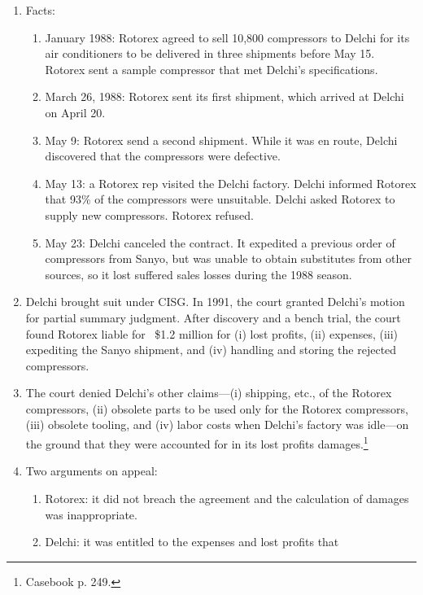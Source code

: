 \begin{enumerate}
    \item Facts:
    \begin{enumerate}
        \item January 1988: Rotorex agreed to sell 10,800 compressors to 
        Delchi for its air conditioners to be delivered in three shipments 
        before May 15. Rotorex sent a sample compressor that met Delchi's 
        specifications.
        \item March 26, 1988: Rotorex sent its first shipment, which arrived 
        at Delchi on April 20.
        \item May 9: Rotorex send a second shipment. While it was en route, 
        Delchi discovered that the compressors were defective.
        \item May 13: a Rotorex rep visited the Delchi factory. Delchi 
        informed Rotorex that 93\% of the compressors were unsuitable. Delchi 
        asked Rotorex to supply new compressors. Rotorex refused.
        \item May 23: Delchi canceled the contract. It expedited a previous 
        order of compressors from Sanyo, but was unable to obtain substitutes 
        from other sources, so it lost suffered sales losses during the 1988 
        season. 
    \end{enumerate}
    \item Delchi brought suit under CISG. In 1991, the court granted Delchi's 
    motion for partial summary judgment. After discovery and a bench trial, 
    the court found Rotorex liable for ~\$1.2 million for (i) lost profits, 
    (ii) expenses, (iii) expediting the Sanyo shipment, and (iv) handling and 
    storing the rejected compressors.
    \item The court denied Delchi's other claims---(i) shipping, etc., 
    of the Rotorex compressors, (ii) obsolete parts to be used only for the 
    Rotorex compressors, (iii) obsolete tooling, and (iv) labor costs when 
    Delchi's factory was idle---on the ground that they were accounted for 
    in its lost profits damages.\footnote{Casebook p. 249.}
    \item Two arguments on appeal:
    \begin{enumerate}
        \item Rotorex: it did not breach the agreement and the calculation of 
        damages was inappropriate.
        \item Delchi: it was entitled to the expenses and lost profits that 

\end{enumerate}
\end{enumerate}
